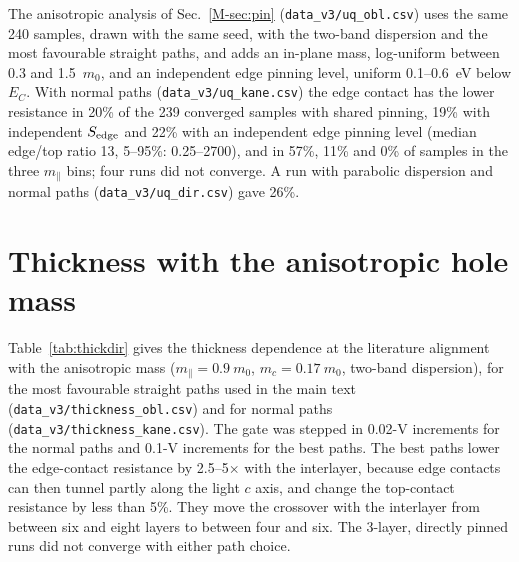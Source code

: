 \documentclass[11pt]{article}
\begin{document}
The anisotropic analysis of Sec.~\ref{M-sec:pin} (\texttt{data\_v3/uq\_obl.csv}) uses the same 240 samples, drawn with the same seed, with the two-band dispersion and the most favourable straight paths, and adds an in-plane mass, log-uniform between 0.3 and 1.5~$m_0$, and an independent edge pinning level, uniform 0.1--0.6~eV below $E_C$. With normal paths (\texttt{data\_v3/uq\_kane.csv}) the edge contact has the lower resistance in 20\% of the 239 converged samples with shared pinning, 19\% with independent $S_{\rm edge}$ and 22\% with an independent edge pinning level (median edge/top ratio 13, 5--95\%: 0.25--2700), and in 57\%, 11\% and 0\% of samples in the three $m_\parallel$ bins; four runs did not converge. A run with parabolic dispersion and normal paths (\texttt{data\_v3/uq\_dir.csv}) gave 26\%.

\section{Thickness with the anisotropic hole mass}
\label{sec:thickdir}
Table~\ref{tab:thickdir} gives the thickness dependence at the literature alignment with the anisotropic mass ($m_\parallel=0.9~m_0$, $m_c=0.17~m_0$, two-band dispersion), for the most favourable straight paths used in the main text (\texttt{data\_v3/thickness\_obl.csv}) and for normal paths (\texttt{data\_v3/thickness\_kane.csv}). The gate was stepped in 0.02-V increments for the normal paths and 0.1-V increments for the best paths. The best paths lower the edge-contact resistance by 2.5--5$\times$ with the interlayer, because edge contacts can then tunnel partly along the light $c$ axis, and change the top-contact resistance by less than 5\%. They move the crossover with the interlayer from between six and eight layers to between four and six. The 3-layer, directly pinned runs did not converge with either path choice.
\end{document}
